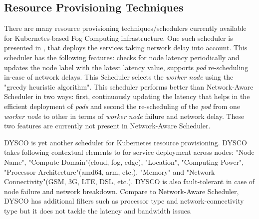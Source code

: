 \subsection{Resource Provisioning Techniques}
There are many resource provisioning techniques/schedulers currently available for Kubernetes-based Fog Computing infrastructure. One such scheduler is presented in \cite{Haja2019}, that deploys the services taking network delay into account. This scheduler\cite{Haja2019} has the following features: checks for node latency periodically and updates the node label with the latest latency value, supports \emph{pod} re-scheduling in-case of network delays. This Scheduler\cite{Haja2019} selects the \emph{worker node} using the "greedy heuristic algorithm". This scheduler\cite{Haja2019} performs better than Network-Aware Scheduler\cite{Santos2019} in two ways: first, continuously updating the latency that helps in the efficient deployment of \emph{pods} and second the re-scheduling of the \emph{pod} from one \emph{worker node} to other in terms of \emph{worker node} failure and network delay. These two features are currently not present in Network-Aware Scheduler. \par
DYSCO\cite{Mittermeier2018} is yet another scheduler for Kubernetes resource provisioning. DYSCO takes following contextual elements to for service deployment across nodes\cite{Mittermeier2018}: "Node Name", "Compute Domain"(cloud, fog, edge), "Location", "Computing Power", "Processor Architecture"(amd64, arm, etc.), "Memory" and "Network Connectivity"(GSM, 3G, LTE, DSL, etc.). DYSCO is also fault-tolerant in case of node failure and network breakdown\cite{Mittermeier2018}. Compare to Network-Aware Scheduler\cite{Santos2019}, DYSCO\cite{Mittermeier2018} has additional filters such as processor type and network-connectivity type but it does not tackle the latency and bandwidth issues. \par
